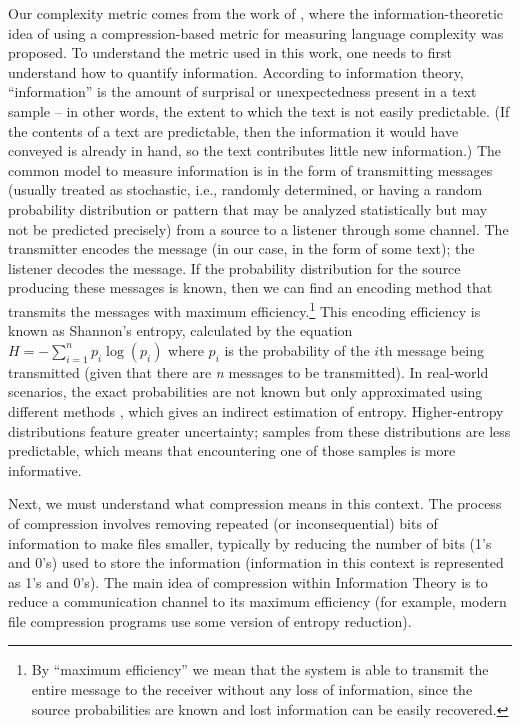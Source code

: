 \documentclass[output=paper]{langscibook}
\begin{document}
Our complexity metric comes from the work of \citet{juola1998measuring}, where the in\-for\-ma\-tion-the\-o\-ret\-ic idea of using a compression-based metric for measuring language complexity was proposed. To understand the metric used in this work, one needs to first understand how to quantify information. According to information theory, “information” is the amount of surprisal or unexpectedness present in a text sample -- in other words, the extent to which the text is not easily predictable. (If the contents of a text are predictable, then the information it would have conveyed is already in hand, so the text contributes little new information.) The common model to measure information is in the form of transmitting messages (usually treated as stochastic, i.e., randomly determined, or having a random probability distribution or pattern that may be analyzed statistically but may not be predicted precisely) from a source to a listener through some channel. The transmitter encodes the message (in our case, in the form of some text); the listener decodes the message. If the probability distribution for the source producing these messages is known, then we can find an encoding method that transmits the messages with maximum efficiency.\footnote{By ``maximum efficiency'' we mean that the system is able to transmit the entire message to the receiver without any loss of information, since the source probabilities are known and lost information can be easily recovered.} This encoding efficiency is known as Shannon’s entropy, calculated by the equation 
$H = -\sum_{i=1}^{n}p_{i} \log ( p_{i} )$
where $p_i$ is the probability of the $i$th message being transmitted (given that there are \textit{n} messages to be transmitted). In real-world scenarios, the exact probabilities are not known but only approximated using different methods \citep{ziv1977universal, ziv1978compression}, which gives an indirect estimation of entropy. Higher-entropy distributions feature greater uncertainty; samples from these distributions are less predictable, which means that encountering one of those samples is more informative.

Next, we must understand what compression means in this context. The process of compression involves removing repeated (or inconsequential) bits of information to make files smaller, typically by reducing the number of bits (1's and 0's) used to store the information (information in this context is represented as 1’s and 0’s). The main idea of compression within Information Theory is to reduce a communication channel to its maximum efficiency (for example, modern file compression programs use some version of entropy reduction). 
\end{document}
